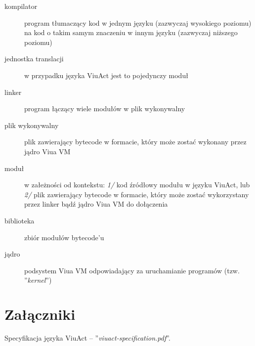 \documentclass[11pt,oneside,a4paper,titlepage,onecolumn]{article}
\begin{document}
\begin{description}
    \item[kompilator] program tłumaczący kod w jednym języku (zazwyczaj wysokiego poziomu) na kod o takim
        samym znaczeniu w innym języku (zazwyczaj niższego poziomu)
    \item[jednostka translacji] w przypadku języka ViuAct jest to pojedynczy moduł
    \item[linker] program łączący wiele modułów w plik wykonywalny
    \item[plik wykonywalny] plik zawierający bytecode w formacie, który może zostać wykonany przez jądro Viua
        VM
    \item[moduł] w załeżności od kontekstu: \emph{1/} kod źródłowy modułu w języku ViuAct, lub \emph{2/} plik
        zawierający bytecode w formacie, który może zostać wykorzystany przez linker bądź jądro Viua VM do
        dołączenia
    \item[biblioteka] zbiór modułów bytecode'u
    \item[jądro] podsystem Viua VM odpowiadający za uruchamianie programów (tzw. ''\emph{kernel}'')
\end{description}

\section{Załączniki}

Specyfikacja języka ViuAct -- ''\emph{viuact-specification.pdf}''.
\end{document}

